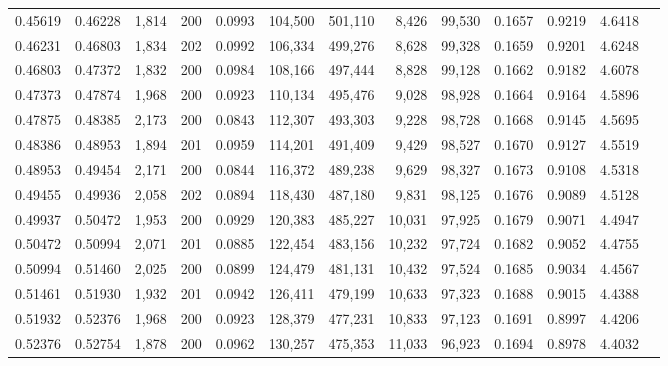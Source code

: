 \begin{tabular}{rrrrrrrrrrrrr}
0.45619 & 0.46228 & 1,814 & 200 &                                     0.0993 & 104,500 & 501,110 &   8,426 &  99,530 & 0.1657 & 0.9219 & 4.6418 \\
0.46231 & 0.46803 & 1,834 & 202 &                                     0.0992 & 106,334 & 499,276 &   8,628 &  99,328 & 0.1659 & 0.9201 & 4.6248 \\
0.46803 & 0.47372 & 1,832 & 200 &                                     0.0984 & 108,166 & 497,444 &   8,828 &  99,128 & 0.1662 & 0.9182 & 4.6078 \\
0.47373 & 0.47874 & 1,968 & 200 &                                     0.0923 & 110,134 & 495,476 &   9,028 &  98,928 & 0.1664 & 0.9164 & 4.5896 \\
0.47875 & 0.48385 & 2,173 & 200 &                                     0.0843 & 112,307 & 493,303 &   9,228 &  98,728 & 0.1668 & 0.9145 & 4.5695 \\
0.48386 & 0.48953 & 1,894 & 201 &                                     0.0959 & 114,201 & 491,409 &   9,429 &  98,527 & 0.1670 & 0.9127 & 4.5519 \\
0.48953 & 0.49454 & 2,171 & 200 &                                     0.0844 & 116,372 & 489,238 &   9,629 &  98,327 & 0.1673 & 0.9108 & 4.5318 \\
0.49455 & 0.49936 & 2,058 & 202 &                                     0.0894 & 118,430 & 487,180 &   9,831 &  98,125 & 0.1676 & 0.9089 & 4.5128 \\
0.49937 & 0.50472 & 1,953 & 200 &                                     0.0929 & 120,383 & 485,227 &  10,031 &  97,925 & 0.1679 & 0.9071 & 4.4947 \\
0.50472 & 0.50994 & 2,071 & 201 &                                     0.0885 & 122,454 & 483,156 &  10,232 &  97,724 & 0.1682 & 0.9052 & 4.4755 \\
0.50994 & 0.51460 & 2,025 & 200 &                                     0.0899 & 124,479 & 481,131 &  10,432 &  97,524 & 0.1685 & 0.9034 & 4.4567 \\
0.51461 & 0.51930 & 1,932 & 201 &                                     0.0942 & 126,411 & 479,199 &  10,633 &  97,323 & 0.1688 & 0.9015 & 4.4388 \\
0.51932 & 0.52376 & 1,968 & 200 &                                     0.0923 & 128,379 & 477,231 &  10,833 &  97,123 & 0.1691 & 0.8997 & 4.4206 \\
0.52376 & 0.52754 & 1,878 & 200 &                                     0.0962 & 130,257 & 475,353 &  11,033 &  96,923 & 0.1694 & 0.8978 & 4.4032 \\

\end{tabular}

